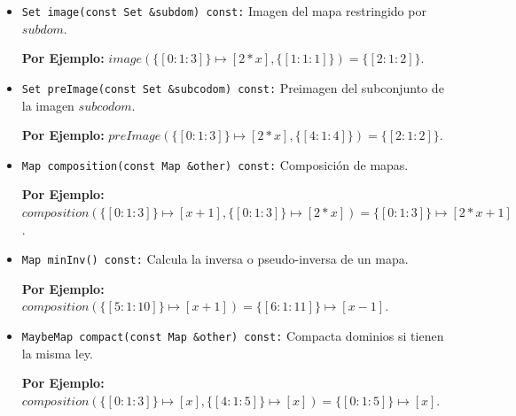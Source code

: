\begin{itemize}
    \item \texttt{Set image(const Set \&subdom) const:} Imagen del mapa restringido por $subdom$.
    \begin{center}
        \textbf{Por Ejemplo:} $image(\{[0:1:3]\} \mapsto [2*x],\{[1:1:1]\}) = \{[2:1:2]\}$.
    \end{center}

    \item \texttt{Set preImage(const Set \&subcodom) const:} Preimagen del subconjunto de la imagen $subcodom$.
    \begin{center}
        \textbf{Por Ejemplo:} $preImage(\{[0:1:3]\} \mapsto [2*x],\{[4:1:4]\}) = \{[2:1:2]\}$.
    \end{center}

    \item \texttt{Map composition(const Map \&other) const:} Composición de mapas.
    \begin{center}
        \textbf{Por Ejemplo:} $composition(\{[0:1:3]\} \mapsto [x+1],\{[0:1:3]\} \mapsto [2*x]) = \{[0:1:3]\} \mapsto [2*x+1]$.
    \end{center}

    \item \texttt{Map minInv() const:} Calcula la inversa o pseudo-inversa de un mapa.
    \begin{center}
                \textbf{Por Ejemplo:}$composition(\{[5:1:10]\} \mapsto [x+1]) = \{[6:1:11]\} \mapsto [x-1]$.
    \end{center}

    \item \texttt{MaybeMap compact(const Map \&other) const:} Compacta dominios si tienen la misma ley.
    \begin{center}

        \textbf{Por Ejemplo:} $composition(\{[0:1:3]\} \mapsto [x],\{[4:1:5]\} \mapsto [x]) = \{[0:1:5]\} \mapsto [x]$.

    \end{center}

\end{itemize}

